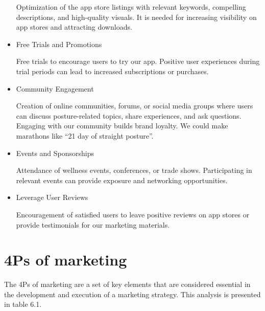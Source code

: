 \begin{itemize}
    Optimization of the app store listings with relevant keywords, compelling descriptions, and high-quality visuals. It is needed for increasing visibility on app stores and attracting downloads.
    \item Free Trials and Promotions

    Free trials to encourage users to try our app. Positive user experiences during trial periods can lead to increased subscriptions or purchases.
    \item Community Engagement

    Creation of online communities, forums, or social media groups where users can discuss posture-related topics, share experiences, and ask questions. Engaging with our community builds brand loyalty. We could make marathons like “21 day of straight posture”.
    \item Events and Sponsorships

    Attendance of wellness events, conferences, or trade shows. Participating in relevant events can provide exposure and networking opportunities.
    \item Leverage User Reviews

    Encouragement of satisfied users to leave positive reviews on app stores or provide testimonials for our marketing materials. 
\end{itemize}

\section{4Ps of marketing}

The 4Ps of marketing are a set of key elements that are considered essential in the development and execution of a marketing strategy. This analysis is presented in table 6.1.


